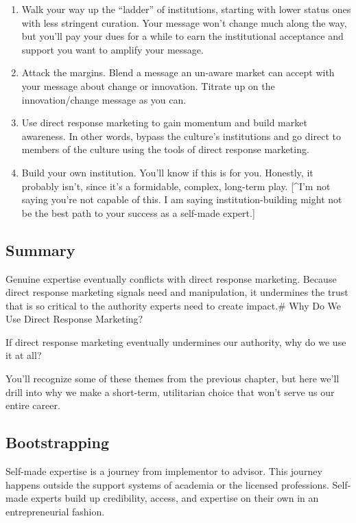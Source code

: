 \documentclass[13pt,]{tufte-handout}
\providecommand{\tightlist}{%
  \setlength{\itemsep}{0pt}\setlength{\parskip}{0pt}}
\begin{document}
\begin{enumerate}
\def\labelenumi{\arabic{enumi}.}
\tightlist
\item
  Walk your way up the ``ladder'' of institutions, starting with lower
  status ones with less stringent curation. Your message won't change
  much along the way, but you'll pay your dues for a while to earn the
  institutional acceptance and support you want to amplify your message.
\item
  Attack the margins. Blend a message an un-aware market can accept with
  your message about change or innovation. Titrate up on the
  innovation/change message as you can.
\item
  Use direct response marketing to gain momentum and build market
  awareness. In other words, bypass the culture's institutions and go
  direct to members of the culture using the tools of direct response
  marketing.
\item
  Build your own institution. You'll know if this is for you. Honestly,
  it probably isn't, since it's a formidable, complex, long-term play.
  {[}\^{}I'm not saying you're not capable of this. I am saying
  institution-building might not be the best path to your success as a
  self-made expert.{]}
\end{enumerate}

\hypertarget{summary-2}{%
\subsection{Summary}\label{summary-2}}

Genuine expertise eventually conflicts with direct response marketing.
Because direct response marketing signals need and manipulation, it
undermines the trust that is so critical to the authority experts need
to create impact.\# Why Do We Use Direct Response Marketing?

If direct response marketing eventually undermines our authority, why do
we use it at all?

You'll recognize some of these themes from the previous chapter, but
here we'll drill into why we make a short-term, utilitarian choice that
won't serve us our entire career.

\hypertarget{bootstrapping-1}{%
\subsection{Bootstrapping}\label{bootstrapping-1}}

Self-made expertise is a journey from implementor to advisor. This
journey happens outside the support systems of academia or the licensed
professions. Self-made experts build up credibility, access, and
expertise on their own in an entrepreneurial fashion.
\end{document}
